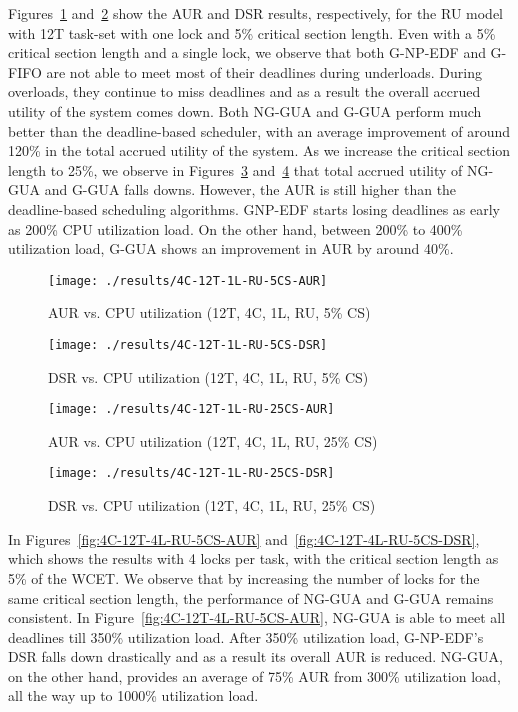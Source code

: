 \documentclass[12pt,dvips]{report}
\begin{document}
Figures~\ref{fig:4C-12T-1L-RU-5CS-AUR} and~\ref{fig:4C-12T-1L-RU-5CS-DSR} show the AUR and DSR results, respectively, for the RU model with 12T task-set with one lock and 5\% critical section length. Even with a 5\% critical section length and a single lock, we observe that both G-NP-EDF and G-FIFO are not able to meet most of their deadlines during underloads. During overloads, they continue to miss deadlines and as a result the overall accrued utility of the system comes down. Both NG-GUA and G-GUA perform much better than the deadline-based scheduler, with an average improvement of around 120\% in the total accrued utility of the system. As we increase the critical section length to 25\%, we observe in Figures~\ref{fig:4C-12T-1L-RU-25CS-AUR} and~\ref{fig:4C-12T-1L-RU-25CS-DSR} that total accrued utility of NG-GUA and G-GUA falls downs. However, the AUR is still higher than the deadline-based scheduling algorithms. GNP-EDF starts losing deadlines as early as 200\% CPU utilization load. On the other hand, between 200\% to 400\% utilization load, G-GUA shows an improvement in AUR by around 40\%.

\begin{figure} [htbp]
  \centering
  \texttt{[image: ./results/4C-12T-1L-RU-5CS-AUR]}
  \caption{AUR vs. CPU utilization (12T, 4C, 1L, RU, 5\% CS)}
    \label{fig:4C-12T-1L-RU-5CS-AUR}
\end{figure}
 
\begin{figure} [htbp]
  \centering
  \texttt{[image: ./results/4C-12T-1L-RU-5CS-DSR]}
  \caption{DSR vs. CPU utilization (12T, 4C, 1L, RU, 5\% CS)}
    \label{fig:4C-12T-1L-RU-5CS-DSR}
\end{figure}
 
\begin{figure} [htbp]
  \centering
  \texttt{[image: ./results/4C-12T-1L-RU-25CS-AUR]}
  \caption{AUR vs. CPU utilization (12T, 4C, 1L, RU, 25\% CS)}
    \label{fig:4C-12T-1L-RU-25CS-AUR}
\end{figure}
 
\begin{figure} [htbp]
  \centering
  \texttt{[image: ./results/4C-12T-1L-RU-25CS-DSR]}
  \caption{DSR vs. CPU utilization (12T, 4C, 1L, RU, 25\% CS)}
    \label{fig:4C-12T-1L-RU-25CS-DSR}    
\end{figure}

In Figures~\ref{fig:4C-12T-4L-RU-5CS-AUR} and~\ref{fig:4C-12T-4L-RU-5CS-DSR}, which shows the results with 4 locks per task, with the critical section length as 5\% of the WCET. We observe that by increasing the number of locks for the same critical section length, the performance of NG-GUA and G-GUA remains consistent. In Figure~\ref{fig:4C-12T-4L-RU-5CS-AUR}, NG-GUA is able to meet all deadlines till 350\% utilization load. After 350\% utilization load, G-NP-EDF's DSR falls down drastically and as a result its overall AUR is reduced. NG-GUA, on the other hand, provides an average of 75\% AUR from 300\% utilization load, all the way up to 1000\% utilization load. 
\end{document}
